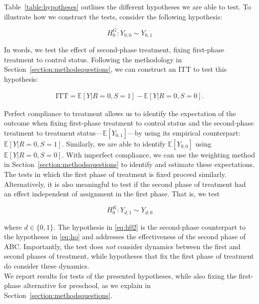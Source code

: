 \noindent Table~\ref{table:hypotheses} outlines the different hypotheses we are able to test. To illustrate how we construct the tests, consider the following hypothesis: 

\begin{equation}
H_{0}^G: Y_{0,0} \sim Y_{0,1}  \label{eq:h0fixfirst}
\end{equation}

\noindent In words, we test the effect of second-phase treatment, fixing first-phase treatment to control status. Following the methodology in Section~\ref{section:methodsquestions}, we can construct an ITT to test this hypothesis: 

\begin{eqnarray}
\text{ITT} = \mathbb{E} \left[ Y | R = 0, S = 1 \right] - \mathbb{E} \left[ Y | R = 0, S = 0 \right]. 
\end{eqnarray}

\noindent Perfect compliance to treatment allows us to identify the expectation of the outcome when fixing first-phase treatment to control status and the second-phase treatment to treatment status---$\mathbb{E} \left[ Y_{0,1} \right]$---by using its empirical counterpart: $\mathbb{E} \left[ Y | R = 0, S = 1 \right]$. Similarly, we are able to identify $\mathbb{E} \left[ Y_{0,0} \right]$ using $\mathbb{E} \left[ Y | R = 0, S = 0 \right]$. With imperfect compliance, we can use the weighting method in Section~\ref{section:methodsquestions} to identify and estimate these expectations. The tests in which the first phase of treatment is fixed proceed similarly.\\

\noindent Alternatively, it is also meaningful to test if the second phase of treatment had an effect independent of assignment in the first phase. That is, we test 

\begin{equation}
H_{0}^K: Y_{d,1} \sim Y_{d,0} \label{eq:h02}
\end{equation}

\noindent where $d \in \{0,1\}$. The hypothesis in \eqref{eq:h02} is the second-phase counterpart to the hypotheses in \eqref{eq:ho} and addresses the effectiveness of the second phase of ABC. Importantly, the test does \emph{not} consider dynamics between the first and second phases of treatment, while hypotheses that fix the first phase of treatment do consider these dynamics.\\

\noindent We report results for tests of the presented hypotheses, while also fixing the first-phase alternative for preschool, as we explain in Section~\ref{section:methodsquestions}.


